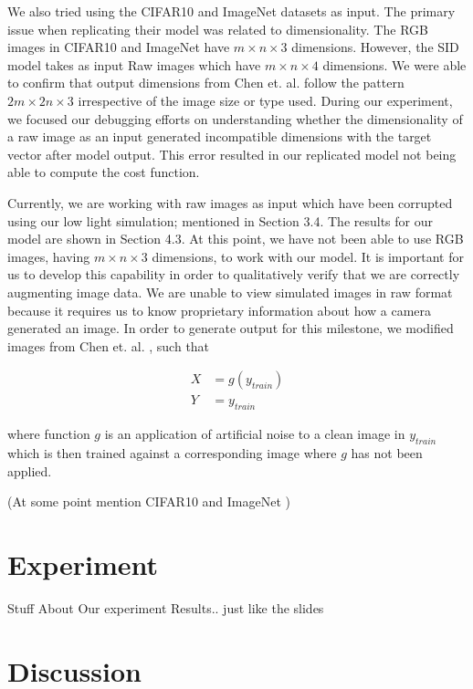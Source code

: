 \documentclass{article}
\begin{document}
We also tried using the CIFAR10 and ImageNet datasets as input. The primary
issue when replicating their model was related to dimensionality. The RGB
images in CIFAR10 and ImageNet have $m \times n \times 3$ dimensions.
However, the SID model takes as input Raw images which have
$m \times n \times 4$ dimensions. We were able to confirm that output
dimensions from Chen et. al. \cite{chen2018learning} follow the pattern
$2m \times 2n \times 3$ irrespective of the image size or type used. During
our experiment, we focused our debugging efforts on understanding whether
the dimensionality of a raw image as an input generated incompatible
dimensions with the target vector after model output. This error resulted
in our replicated model not being able to compute the cost function.\newline

Currently, we are working with raw images as input which have been corrupted
using our low light simulation; mentioned in Section 3.4. The results
for our model are shown in Section 4.3. At this point, we have not been
able to use RGB images, having $m \times n \times 3$ dimensions, to work
with our model. It is important for us to develop this
capability in order to qualitatively verify that we are correctly augmenting
image data. We are unable to view simulated images in raw format because
it requires us to know proprietary information about how a camera
generated an image. In order to generate output for this milestone, we
modified images from Chen et. al. \cite{chen2018learning}, such that

\begin{align*}
  X &= g(y_{train})\\
  Y &= y_{train}
\end{align*}

where function $g$ is an application of artificial noise to a clean
image in $y_{train}$ which is then trained against a corresponding
image where $g$ has not been applied.

(At some point mention CIFAR10 \cite{cifar10} and ImageNet
\cite{imagenet_cvpr09})  

\section{Experiment}

Stuff About Our experiment
Results.. just like the slides

\section{Discussion}
\end{document}
